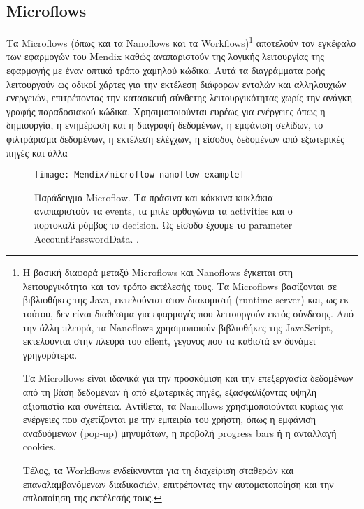         \subsection{Microflows} \label{sec:MendixMicroflows}
            Τα Microflows (όπως και τα Nanoflows και τα Workflows)\footnote{Η βασική διαφορά μεταξύ Microflows και Nanoflows έγκειται στη λειτουργικότητα και τον τρόπο εκτέλεσής τους. Τα Microflows βασίζονται σε βιβλιοθήκες της Java, εκτελούνται στον διακομιστή (runtime server) και, ως εκ τούτου, δεν είναι διαθέσιμα για εφαρμογές που λειτουργούν εκτός σύνδεσης. Από την άλλη πλευρά, τα Nanoflows χρησιμοποιούν βιβλιοθήκες της JavaScript, εκτελούνται στην πλευρά του client, γεγονός που τα καθιστά εν δυνάμει γρηγορότερα.

Τα Microflows είναι ιδανικά για την προσκόμιση και την επεξεργασία δεδομένων από τη βάση δεδομένων ή από εξωτερικές πηγές, εξασφαλίζοντας υψηλή αξιοπιστία και συνέπεια. Αντίθετα, τα Nanoflows χρησιμοποιούνται κυρίως για ενέργειες που σχετίζονται με την εμπειρία του χρήστη, όπως η εμφάνιση αναδυόμενων (pop-up) μηνυμάτων, η προβολή progress bars ή η ανταλλαγή cookies.

Τέλος, τα Workflows ενδείκνυνται για τη διαχείριση σταθερών και επαναλαμβανόμενων διαδικασιών, επιτρέποντας την αυτοματοποίηση και την απλοποίηση της εκτέλεσής τους.} αποτελούν τον εγκέφαλο των εφαρμογών του Mendix καθώς αναπαριστούν της λογικής λειτουργίας της εφαρμογής με έναν οπτικό τρόπο χαμηλού κώδικα. Αυτά τα διαγράμματα ροής λειτουργούν ως οδικοί χάρτες για την εκτέλεση διάφορων εντολών και αλληλουχιών ενεργειών, επιτρέποντας την κατασκευή σύνθετης λειτουργικότητας χωρίς την ανάγκη γραφής παραδοσιακού κώδικα. Χρησιμοποιούνται ευρέως για ενέργειες όπως η δημιουργία, η ενημέρωση και η διαγραφή δεδομένων, η εμφάνιση σελίδων, το φιλτράρισμα δεδομένων, η εκτέλεση ελέγχων, η είσοδος δεδομένων από εξωτερικές πηγές και άλλα

            \begin{figure}[h!] \noindent \centering
                    \texttt{[image: Mendix/microflow-nanoflow-example]}
                    \caption{\centering Παράδειγμα Microflow. Τα πράσινα και κόκκινα κυκλάκια αναπαριστούν τα events, τα μπλε ορθογώνια τα activities και ο πορτοκαλί ρόμβος το decision. Ως είσοδο έχουμε το parameter AccountPasswordData. \cite{mendixDoc}.}
            \end{figure}

